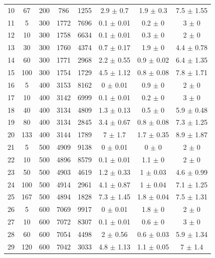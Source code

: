 \documentclass[11pt]{article}
\begin{document}
\begin{table}[]
{\begin{tabular}{cccccccc}
				10 & 67 & 200 & 786 & 1255 & 2.9 $\pm$ 0.7 & 1.9 $\pm$ 0.3 & 7.5 $\pm$ 1.55 \\
				\rowcolor[HTML]{EFEFEF} 
				11 & 5 & 300 & 1772 & 7696 & 0.1 $\pm$ 0.01 & 0.2 $\pm$ 0 & 3 $\pm$ 0 \\
				\rowcolor[HTML]{EFEFEF} 
				12 & 10 & 300 & 1758 & 6634 & 0.1 $\pm$ 0.01 & 0.3 $\pm$ 0 & 2 $\pm$ 0 \\
				\rowcolor[HTML]{EFEFEF} 
				13 & 30 & 300 & 1760 & 4374 & 0.7 $\pm$ 0.17 & 1.9 $\pm$ 0 & 4.4 $\pm$ 0.78 \\
				\rowcolor[HTML]{EFEFEF} 
				14 & 60 & 300 & 1771 & 2968 & 2.2 $\pm$ 0.55 & 0.9 $\pm$ 0.02 & 6.4 $\pm$ 1.35 \\
				\rowcolor[HTML]{EFEFEF} 
				15 & 100 & 300 & 1754 & 1729 & 4.5 $\pm$ 1.12 & 0.8 $\pm$ 0.08 & 7.8 $\pm$ 1.71 \\
				16 & 5 & 400 & 3153 & 8162 & 0 $\pm$ 0.01 & 0.9 $\pm$ 0 & 2 $\pm$ 0 \\
				17 & 10 & 400 & 3142 & 6999 & 0.1 $\pm$ 0.01 & 0.2 $\pm$ 0 & 3 $\pm$ 0 \\
				18 & 40 & 400 & 3134 & 4809 & 1.3 $\pm$ 0.13 & 0.5 $\pm$ 0 & 5.9 $\pm$ 0.48 \\
				19 & 80 & 400 & 3134 & 2845 & 3.4 $\pm$ 0.67 & 0.8 $\pm$ 0.08 & 7.3 $\pm$ 1.25 \\
				20 & 133 & 400 & 3144 & 1789 & 7 $\pm$ 1.7 & 1.7 $\pm$ 0.35 & 8.9 $\pm$ 1.87 \\
				\rowcolor[HTML]{EFEFEF} 
				21 & 5 & 500 & 4909 & 9138 & 0 $\pm$ 0.01 & 0 $\pm$ 0 & 2 $\pm$ 0 \\
				\rowcolor[HTML]{EFEFEF} 
				22 & 10 & 500 & 4896 & 8579 & 0.1 $\pm$ 0.01 & 1.1 $\pm$ 0 & 2 $\pm$ 0 \\
				\rowcolor[HTML]{EFEFEF} 
				23 & 50 & 500 & 4903 & 4619 & 1.2 $\pm$ 0.33 & 1 $\pm$ 0.03 & 4.6 $\pm$ 0.99 \\
				\rowcolor[HTML]{EFEFEF} 
				24 & 100 & 500 & 4914 & 2961 & 4.1 $\pm$ 0.87 & 1 $\pm$ 0.04 & 7.1 $\pm$ 1.25 \\
				\rowcolor[HTML]{EFEFEF} 
				25 & 167 & 500 & 4894 & 1828 & 7.3 $\pm$ 1.45 & 1.8 $\pm$ 0.04 & 7.5 $\pm$ 1.31 \\
				26 & 5 & 600 & 7069 & 9917 & 0 $\pm$ 0.01 & 1.8 $\pm$ 0 & 2 $\pm$ 0 \\
				27 & 10 & 600 & 7072 & 8307 & 0.1 $\pm$ 0.01 & 0.6 $\pm$ 0 & 3 $\pm$ 0 \\
				28 & 60 & 600 & 7054 & 4498 & 2 $\pm$ 0.56 & 0.6 $\pm$ 0.03 & 5.9 $\pm$ 1.34 \\
				29 & 120 & 600 & 7042 & 3033 & 4.8 $\pm$ 1.13 & 1.1 $\pm$ 0.05 & 7 $\pm$ 1.4 \\

\end{tabular}}
\end{table}
\end{document}
